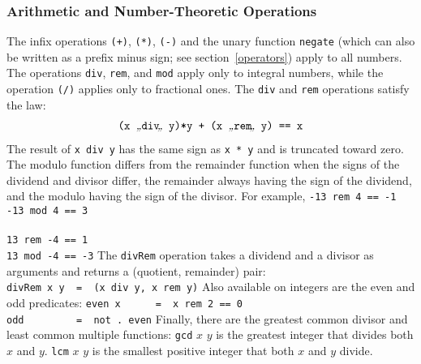 {\subsubsection{Arithmetic and Number-Theoretic Operations}
\label{arithmetic-operators}

The infix operations \mbox{\tt (+)}\indextt{+}, \mbox{\tt (*)}\indextt{*},
\mbox{\tt (-)}\indextt{-} and the unary function
\mbox{\tt negate} (which can also be written as a prefix minus sign; see
section~\ref{operators}) apply to all numbers.  The operations
\mbox{\tt div}, \mbox{\tt rem}, and
\mbox{\tt mod} apply only to integral numbers, while the operation
\mbox{\tt (/)}\indextt{/} applies only to fractional ones.  The \mbox{\tt div} and
\mbox{\tt rem} operations satisfy the law:
\[\ba{c}
\mbox{\tt (x\ }\bkqB\mbox{\tt div}\bkqA\mbox{\tt \ y)*y\ +\ (x\ }\bkqB\mbox{\tt rem}\bkqA\mbox{\tt \ y)\ ==\ x}
\ea\]
The result of \mbox{\tt x\ }\bkqB\mbox{\tt div}\bkqA\mbox{\tt \ y} has the same sign as \mbox{\tt x\ *\ y}
and is truncated toward zero.  The modulo function differs from the
remainder function when the signs of the dividend and divisor differ, the
remainder always having the sign of the dividend, and the modulo
having the sign of the divisor.  For example,
\bprog
\mbox{\tt -13\ }\bkqB\mbox{\tt rem}\bkqA\mbox{\tt \ 4\ ==\ -1}\\
\mbox{\tt -13\ }\bkqB\mbox{\tt mod}\bkqA\mbox{\tt \ 4\ ==\ 3}\\
\mbox{\tt }\\[-8pt]
\mbox{\tt 13\ }\bkqB\mbox{\tt rem}\bkqA\mbox{\tt \ -4\ ==\ 1}\\
\mbox{\tt 13\ }\bkqA\mbox{\tt mod}\bkqA\mbox{\tt \ -4\ ==\ -3}
\eprog
The \mbox{\tt divRem} operation takes a dividend and a divisor as arguments
and returns a (quotient, remainder) pair:
\bprog
\mbox{\tt divRem\ x\ y\ \ =\ \ (x\ }\bkqB\mbox{\tt div}\bkqA\mbox{\tt \ y,\ x\ }\bkqB\mbox{\tt rem}\bkqA\mbox{\tt \ y)}
\eprog
Also available on integers are the even and odd predicates:
\bprog
\mbox{\tt even\ x\ \ \ \ \ \ =\ \ x\ }\bkqB\mbox{\tt rem}\bkqA\mbox{\tt \ 2\ ==\ 0}\\
\mbox{\tt odd\ \ \ \ \ \ \ \ \ =\ \ not\ .\ even}
\eprog{}
Finally, there are the greatest common divisor and least common
multiple functions: \mbox{\tt gcd} $x$ $y$ is the greatest
integer that divides both $x$ and $y$.  \mbox{\tt lcm} $x$ $y$
is the smallest positive integer that both $x$ and $y$ divide.

}
